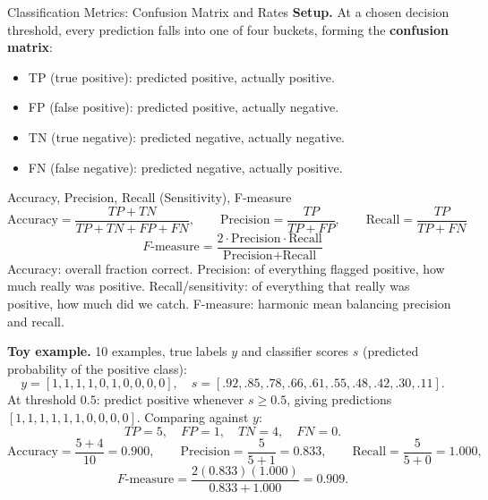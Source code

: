 \documentclass[aspectratio=169,10pt]{beamer}
\begin{document}
\begin{frame}[allowframebreaks]{Classification Metrics: Confusion Matrix and Rates}
  \textbf{Setup.} At a chosen decision threshold, every prediction falls
  into one of four buckets, forming the \textbf{confusion matrix}:
  \begin{itemize}
    \item TP (true positive): predicted positive, actually positive.
    \item FP (false positive): predicted positive, actually negative.
    \item TN (true negative): predicted negative, actually negative.
    \item FN (false negative): predicted negative, actually positive.
  \end{itemize}

  \begin{block}{Accuracy, Precision, Recall (Sensitivity), F-measure}
    \[
      \text{Accuracy} = \frac{TP+TN}{TP+TN+FP+FN}, \qquad
      \text{Precision} = \frac{TP}{TP+FP}, \qquad
      \text{Recall} = \frac{TP}{TP+FN}
    \]
    \[
      F\text{-measure} = \frac{2 \cdot \text{Precision}\cdot \text{Recall}}{\text{Precision}+\text{Recall}}
    \]
    Accuracy: overall fraction correct. Precision: of everything flagged
    positive, how much really was positive. Recall/sensitivity: of
    everything that really was positive, how much did we catch.
    F-measure: harmonic mean balancing precision and recall.
  \end{block}

  \framebreak

  \textbf{Toy example.} 10 examples, true labels $y$ and classifier scores
  $s$ (predicted probability of the positive class):
  \[
    y = [1,1,1,1,0,1,0,0,0,0], \quad
    s = [.92,.85,.78,.66,.61,.55,.48,.42,.30,.11].
  \]
  At threshold $0.5$: predict positive whenever $s\ge 0.5$, giving
  predictions $[1,1,1,1,1,1,0,0,0,0]$. Comparing against $y$:
  \[
    TP=5,\quad FP=1,\quad TN=4,\quad FN=0.
  \]
  \[
    \text{Accuracy} = \frac{5+4}{10} = 0.900, \qquad
    \text{Precision} = \frac{5}{5+1} = 0.833, \qquad
    \text{Recall} = \frac{5}{5+0} = 1.000,
  \]
  \[
    F\text{-measure} = \frac{2(0.833)(1.000)}{0.833+1.000} = 0.909.
  \]
\end{frame}
\end{document}

